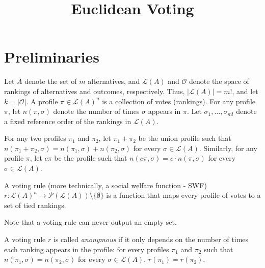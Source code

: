 \documentclass[10pt,letterpaper]{article}
\title{Euclidean Voting}
\newcommand{\calL}{{\mathcal{L}}}
\newcommand{\rank}{{\calL(A)}}
\newcommand{\calO}{{\mathcal{O}}}
\newcommand{\calP}{{\mathcal{P}}}
\newenvironment{definition}[1][Definition]{\begin{trivlist}
\item[\hskip \labelsep {\bfseries #1}]}{\end{trivlist}}
\begin{document}
\maketitle


\section{Preliminaries}

Let $A$ denote the set of $m$ alternatives, and $\rank$ and $\calO$ denote the space of rankings of alternatives and outcomes, respectively. Thus, $|\rank| = m!$, and let $k = |\calO|$. A profile $\pi \in \rank^n$ is a collection of votes (rankings). For any profile $\pi$, let $n(\pi,\sigma)$ denote the number of times $\sigma$ appears in $\pi$. Let $\sigma_1,\ldots,\sigma_{m!}$ denote a fixed reference order of the rankings in $\rank$. 

For any two profiles $\pi_1$ and $\pi_2$, let $\pi_1+\pi_2$ be the union profile such that $n(\pi_1+\pi_2,\sigma) = n(\pi_1,\sigma)+n(\pi_2,\sigma)$ for every $\sigma \in \rank$. Similarly, for any profile $\pi$, let $c \pi$ be the profile such that $n(c \pi,\sigma) = c \cdot n(\pi,\sigma)$ for every $\sigma \in \rank$. 


\begin{definition}[Voting Rule]
A voting rule (more technically, a social welfare function - SWF) $r : \rank^n \rightarrow \calP(\rank)\setminus\{\emptyset\}$ is a function that maps every profile of votes to a set of tied rankings. 
\end{definition}

Note that a voting rule can never output an empty set.


\begin{definition}[Anonymity]
A voting rule $r$ is called \emph{anonymous} if it only depends on the number of times each ranking appears in the profile: for every profiles $\pi_1$ and $\pi_2$ such that $n(\pi_1,\sigma) = n(\pi_2,\sigma)$ for every $\sigma \in \rank$, $r(\pi_1) = r(\pi_2)$. 
\end{definition}

\end{document}
